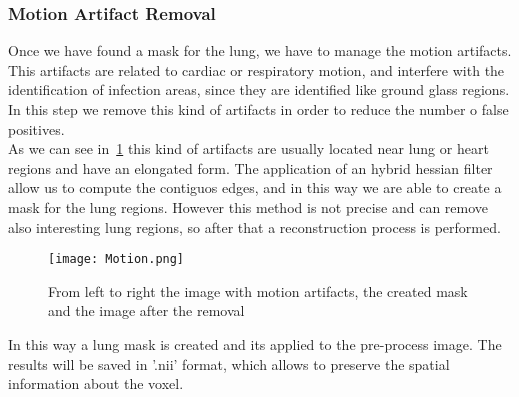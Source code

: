 \documentclass{standalone}
\begin{document}
	\subsubsection*{Motion Artifact Removal}
	
	Once we have found a mask for the lung, we have to manage the motion artifacts. This artifacts are related to cardiac or respiratory motion, and interfere with the identification of infection areas, since they are identified like ground glass regions.  In this step we remove this kind of artifacts in order to reduce the number o false positives.\\ As we can see in  \figurename\,\ref{fig:Motion} this kind of artifacts are usually located near lung or heart regions and have an elongated form. The application of an hybrid hessian filter allow us to compute the contiguos edges, and in this way we are able to create a mask for the lung regions. However this method is not precise and can remove also interesting lung regions, so after that a reconstruction process is performed.\\
	
	\begin{figure}[h!]
		\centering
			\texttt{[image: Motion.png]}
			\caption{From left to right the image with motion artifacts, the created mask and the image after the removal}
			\label{fig:Motion}
	\end{figure}
	
	
	In this way a lung mask is created and its applied to the pre-process image. The results will be saved in '.nii' format, which allows to preserve the spatial information about the voxel.
	
	
	
		
\end{document}

